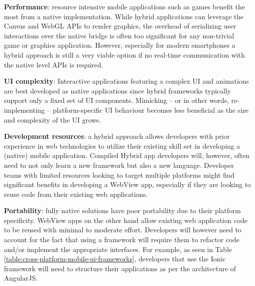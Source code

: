 \documentclass[thesis.tex]{subfiles}
\begin{document}
\begin{itemize}

	\begin{item}
	\textbf{Performance}: resource intensive mobile applications such as games benefit the most from a native implementation. While hybrid applications can leverage the Canvas and WebGL APIs to render graphics, the overhead of serializing user interactions over the native bridge is often too significant for any non-trivial game or graphics application. However, especially for modern smartphones a hybrid approach is still a very viable option if no real-time communication with the native level APIs is required.
	\end{item}

	\begin{item}
	\textbf{UI complexity}: Interactive applications featuring a complex UI and animations are best developed as native applications since hybrid frameworks typically support only a fixed set of UI components. Mimicking -- or in other words, re-implementing -- platform-specific UI behaviour becomes less beneficial as the size and complexity of the UI grows.
	\end{item}

	\begin{item}
	\textbf{Development resources}: a hybrid approach allows developers with prior experience in web technologies to utilize their existing skill set in developing a (native) mobile application. Compiled Hybrid app developers will, however, often need to not only learn a new framework but also a new language. Developer teams with limited resources looking to target multiple platforms might find significant benefits in developing a WebView app, especially if they are looking to reuse code from their existing web applications.
	\end{item}

	\begin{item}
	\textbf{Portability}: fully native solutions have poor portability due to their platform specificity. WebView apps on the other hand allow existing web application code to be reused with minimal to moderate effort. Developers will however need to account for the fact that using a framework will require them to refactor code and/or implement the appropriate interfaces. For example, as seen in Table \ref{table:cross-platform-mobile-ui-frameworks}, developers that use the Ionic framework will need to structure their applications as per the architecture of AngularJS.
	\end{item}

\end{itemize}
\end{document}
